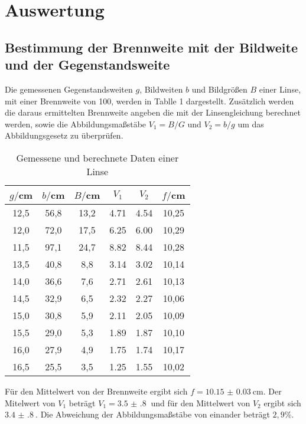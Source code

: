 \section{Auswertung}
\label{sec:Auswertung}

\subsection{Bestimmung der Brennweite mit der Bildweite und der Gegenstandsweite}

Die gemessenen Gegenstandsweiten $g$, Bildweiten $b$ und Bildgrößen $B$ einer Linse, mit einer
Brennweite von 100, werden in Tablle 1 dargestellt. Zusätzlich werden die daraus ermittelten
Brennweite angeben die mit der Linsengleichung berechnet werden, sowie die Abbildungsmaßstäbe $V_1 = B/G$ und $V_2=b/g$
um das Abbildungsgesetz zu überprüfen.
\begin{table}[H]
  \centering
  \caption{Gemessene und berechnete Daten einer Linse}
  \label{tab:Widerstand}
  \begin{tabular}{c c c c c c}
    \toprule
    $g/$cm  & $b/$cm & $B / $cm & $V_1$ & $V_2$ & $f/$cm \\
    \midrule
    12,5 &    56,8  & 13,2 & 4.71 &   4.54   &  10,25   \\
    12,0 &    72,0  & 17,5 & 6.25 &   6.00   &  10,29   \\
    11,5 &    97,1  & 24,7 & 8.82 &   8.44   &  10,28   \\
    13,5 &    40,8  & 8,8  & 3.14 &   3.02   &  10,14  \\
    14,0 &    36,6  & 7,6  & 2.71 &   2.61   &  10,13  \\
    14,5 &    32,9  & 6,5  & 2.32 &   2.27   &  10,06  \\
    15,0 &    30,8  & 5,9  & 2.11 &   2.05   &  10,09  \\
    15,5 &    29,0  & 5,3  & 1.89 &   1.87   &  10,10  \\
    16,0 &    27,9  & 4,9  & 1.75 &   1.74   &  10,17  \\
    16,5 &    25,5  & 3,5  & 1.25 &   1.55   &  10,02  \\
    \bottomrule
  \end{tabular}
\end{table}



Für den Mittelwert von der Brennweite ergibt sich $f = \SI{10.15(3)}{\centi\meter}$. Der
Mitelwert von $V_1$ beträgt $V_1 = \SI{3.5(8)}{}$ und für den Mittelwert von $V_2$ ergibt sich
$\SI{3.4(8)}{}$.
Die Abweichung der Abbildungsmaßstäbe von einander beträgt $2,9$\%.

